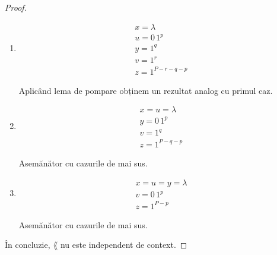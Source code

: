 \begin{proof}
\begin{enumerate}
        \item
              \begin{gather*}
                  x = \lambda \\
                  u = 0 \, 1^p \\
                  y = 1^q \\
                  v = 1^r \\
                  z = 1^{P - r - q - p}
              \end{gather*}

              Aplicând lema de pompare obținem un rezultat analog cu primul caz.

        \item
              \begin{gather*}
                  x = u = \lambda \\
                  y = 0 \, 1^p \\
                  v = 1^q \\
                  z = 1^{P - q - p}
              \end{gather*}

              Asemănător cu cazurile de mai sus.

        \item
              \begin{gather*}
                  x = u = y = \lambda \\
                  v = 0 \, 1^p \\
                  z = 1^{P - p}
              \end{gather*}

              Asemănător cu cazurile de mai sus.
    \end{enumerate}

    În concluzie, \(\lang\) nu este independent de context.
\end{proof}

